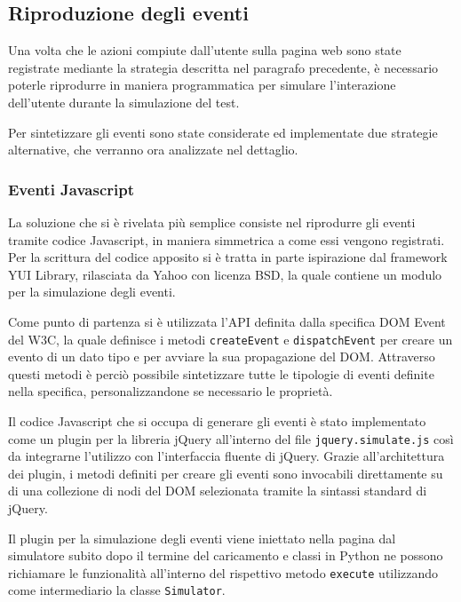 
\subsection{Riproduzione degli eventi}

Una volta che le azioni compiute dall'utente sulla pagina web sono state registrate mediante la strategia descritta nel paragrafo precedente, è necessario poterle riprodurre in maniera programmatica per simulare l'interazione dell'utente durante la simulazione del test.

Per sintetizzare gli eventi sono state considerate ed implementate due strategie alternative, che verranno ora analizzate nel dettaglio.

\subsubsection{Eventi Javascript}

La soluzione che si è rivelata più semplice consiste nel riprodurre gli eventi tramite codice Javascript, in maniera simmetrica a come essi vengono registrati. Per la scrittura del codice apposito si è tratta in parte ispirazione dal framework YUI Library, rilasciata da Yahoo con licenza BSD, la quale contiene un modulo per la simulazione degli eventi. 

Come punto di partenza si è utilizzata l'API definita dalla specifica DOM Event del W3C, la quale definisce i metodi \verb|createEvent| e \verb|dispatchEvent| per creare un evento di un dato tipo e per avviare la sua propagazione del DOM. Attraverso questi metodi è perciò possibile sintetizzare tutte le tipologie di eventi definite nella specifica, personalizzandone se necessario le proprietà.

Il codice Javascript che si occupa di generare gli eventi è stato implementato come un plugin per la libreria jQuery all'interno del file \verb|jquery.simulate.js| così da integrarne l'utilizzo con l'interfaccia fluente di jQuery. Grazie all'architettura dei plugin, i metodi definiti per creare gli eventi sono invocabili direttamente su di una collezione di nodi del DOM selezionata tramite la sintassi standard di jQuery.



Il plugin per la simulazione degli eventi viene iniettato nella pagina dal simulatore subito dopo il termine del caricamento e classi in Python ne possono richiamare le funzionalità all'interno del rispettivo metodo \verb|execute| utilizzando come intermediario la classe \verb|Simulator|. 

